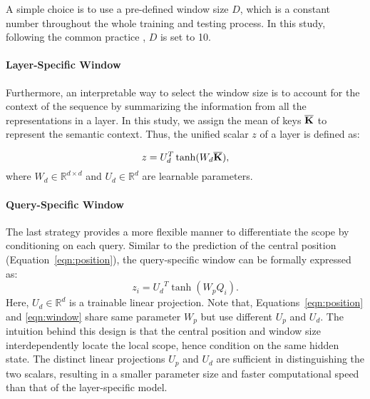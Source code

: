 \documentclass[11pt,a4paper]{article}
\newcommand*\mean[1]{\overline{#1}}
\begin{document}
A simple choice is to use a pre-defined window size $D$, which is a constant number throughout the whole training and testing process. In this study, following the common practice \cite{luong2015effective}, $D$ is set to 10.

\iffalse  
\paragraph{\bf Unified-Specific Window} 
Since the local range may differ between attention heads, the suitable window size for each head is more flexible. As a result, we assigned the scalar $z^h$ as a trainable parameter, namely: 
    \begin{equation}
     D = N\cdot \text{sigmoid}(z^h),
    \end{equation} 
  where $N$ is a pre-defined constant number and in this work we set $N=50$, which is the maximum sentence length. 
 \fi
 
 
\paragraph{\bf Layer-Specific Window} 
  
Furthermore, an interpretable way to select the window size is to account for the context of the sequence by summarizing the information from all the representations in a layer. In this study, we assign the mean of keys $\mean{\bf K}$ to represent the semantic context. Thus, the unified scalar $z$ of a layer  is defined as:

\begin{equation}
     z = {U_d^T\tanh (W_d \mean{\bf K})},
  \end{equation} 
  where $W_d\in \mathbb{R}^{d \times d}$ and $U_d\in\mathbb{R}^{d}$ are learnable parameters.


\paragraph{\bf Query-Specific Window} 
The last strategy provides a more flexible manner to differentiate the scope by conditioning on each query. Similar to the prediction of the central position (Equation~\ref{eqn:position}), the query-specific window can be formally expressed as:
 \begin{equation}
  z_i = {U_d}^T \tanh (W_p Q_i).
  \label{eqn:window}
 \end{equation}
Here, $U_d\in\mathbb{R}^{d}$ is a trainable linear projection. Note that, Equations~\ref{eqn:position} and \ref{eqn:window} share same parameter $W_p$ but use different $U_p$ and $U_d$.  The intuition behind this design is that the central position and window size interdependently locate the local scope, hence condition on the same hidden state. The distinct linear projections $U_p$ and $U_d$ are sufficient in distinguishing the two scalars, resulting in a smaller parameter size and faster computational speed than that of the layer-specific model.
\end{document}
